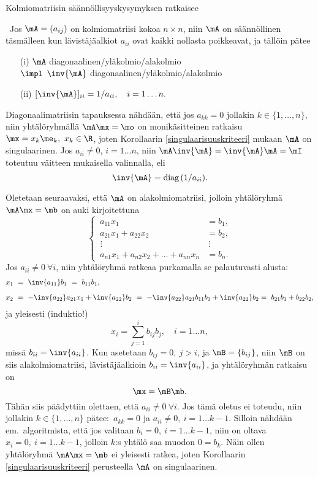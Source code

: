 Kolmiomatriisin säännöllisyyskysymyksen ratkaisee
\begin{Lause} \label{kolmiomatriisi} \, 
Jos $\mA = (a_{ij})$ on kolmiomatriisi kokoa $n \times n$, niin $\mA$ on säännöllinen 
täsmälleen kun lävistäjäalkiot $a_{ii}$  ovat kaikki nollasta poikkeavat, ja tällöin pätee
\begin{itemize}
\item[(i)]  $\mA$ diagonaalinen/yläkolmio/alakolmio \\ $\impl$ $\inv{\mA}$ 
            diagonaalinen/yläkolmio/alakolmio
\item[(ii)] $[\inv{\mA}]_{ii} = 1/a_{ii}, \quad i=1 \ldots n.$
\end{itemize}
\end{Lause}
\tod Diagonaalimatriisin tapauksessa nähdään, että jos $a_{kk}=0$ jollakin 
$k \in \{1,\ldots,n\}$, niin yhtälöryhmällä $\mA \mx = \mo$ on monikäsitteinen ratkaisu 
$\mx = x_k \me_k,\ x_k\in\R$, joten Korollaarin \ref{singulaarisuuskriteeri} mukaan $\mA$ on 
singulaarinen. Jos $a_{ii} \neq 0$, $i = 1\ldots n$, niin $\mA \inv{\mA} = \inv{\mA} \mA = \mI$
toteutuu väitteen mukaisella valinnalla, eli
\[
\inv{\mA} = \text{diag} \, (1/a_{ii}).
\]

Oletetaan seuraavaksi, että $\mA$ on alakolmiomatriisi, jolloin yhtälöryhmä $\mA\mx=\mb$ on
auki kirjoitettuna
\[
\begin{cases}
\,a_{11} x_1 &= b_1, \\
\,a_{21} x_1 + a_{22} x_2 &= b_2, \\
\ \vdots & \ \vdots \\
\,a_{n1} x_1 + a_{n2} x_2 + \ldots + a_{nn} x_n &= b_n.
\end{cases}
\]
Jos $a_{ii}\neq 0\ \forall i$, niin yhtälöryhmä ratkeaa purkamalla se palautuvasti alusta:
\begin{align*}
x_1\ &=\ \inv{a_{11}}b_1\ =\ b_{11}b_1, \\[2mm]
x_2\ &=\ -\inv{a_{22}}a_{21}x_1 + \inv{a_{22}}b_2\ 
      =\ -\inv{a_{22}}a_{21}b_{11}b_1 + \inv{a_{22}}b_2
      =\ b_{21}b_1 + b_{22}b_2,
\end{align*}
ja yleisesti (induktio!)
\[
x_i = \sum_{j=1}^i b_{ij}b_j, \quad i = 1 \ldots n,
\]
missä $b_{ii} = \inv{a_{ii}}$. Kun asetetaan $b_{ij}=0,\ j>i$, ja $\mB = \{b_{ij}\}$, niin
$\mB$ on siis alakolmiomatriisi, lävistäjäalkioin $b_{ii}=\inv{a_{ii}}$, ja yhtälöryhmän
ratkaisu on
\[
\mx = \mB\mb.
\]
Tähän siis päädyttiin olettaen, että $a_{ii}\neq 0\ \forall i$. Jos tämä oletus ei toteudu, 
niin jollakin $k \in \{1, \ldots, n\}$ pätee: $\,a_{kk} = 0$ ja 
$a_{ii} \neq 0, \ i=1 \ldots k-1$. Silloin nähdään em.\ algoritmista, että jos valitaan 
$b_i=0, \ i=1 \ldots k-1$, niin on oltava $x_i = 0,\ i=1 \ldots k-1$, jolloin $k$:s yhtälö saa
muodon $0=b_k$. Näin ollen yhtälöryhmä $\mA\mx=\mb$ ei yleisesti ratkea, joten Korollaarin
\ref{singulaarisuuskriteeri} perusteella $\mA$ on singulaarinen.

